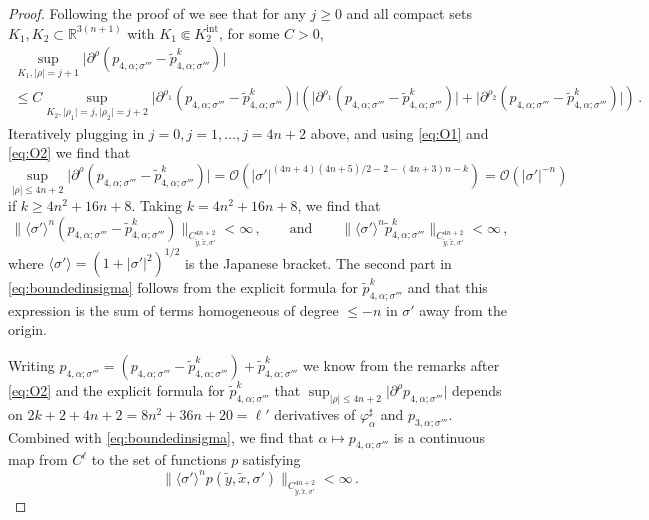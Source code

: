 \documentclass[11pt]{amsart}
\theoremstyle{definition}
\numberwithin{equation}{section}
\newcommand{\mR}{\mathbb{R}}                    %
\newcommand{\abs}[1]{\lvert #1 \rvert}          %
\newcommand{\norm}[1]{\lVert #1 \rVert}         %
\newcommand{\p}{\partial}
\begin{document}
\begin{proof}
    Following the proof of \cite[Thm.~2.9]{zbMATH03267579} we see that for any $j\geq 0$ and all compact sets $K_1,K_2 \subset \mR^{3(n+1)}$ with $K_1 \Subset K_2^{\mathrm{int}}$, for some $C>0$,
    \begin{gather*}
        \sup_{K_1,\abs{\rho}=j+1}\abs{\p^\rho (p_{4,\alpha;\sigma'''}-\tilde{p}^k_{4,\alpha;\sigma'''})} \\
        \leq C\sup_{K_2,\abs{\rho_1}=j,\abs{\rho_2}=j+2}\abs{\p^{\rho_1}(p_{4,\alpha;\sigma'''}-\tilde{p}^k_{4,\alpha;\sigma'''})}\left(\abs{\p^{\rho_1}(p_{4,\alpha;\sigma'''}-\tilde{p}^k_{4,\alpha;\sigma'''})}+\abs{\p^{\rho_2} (p_{4,\alpha;\sigma'''}-\tilde{p}^k_{4,\alpha;\sigma'''})}\right)\,.
    \end{gather*}
    Iteratively plugging in $j=0, j=1,\dots,j=4n+2$ above, and using \eqref{eq:O1} and \eqref{eq:O2} we find that
    \[
        \sup_{\abs{\rho}\leq 4n+2}\abs{\partial^\rho(p_{4,\alpha;\sigma'''}-\tilde{p}^k_{4,\alpha;\sigma'''})} = \mathcal{O}(\abs{\sigma'}^{(4n+4)(4n+5)/2-2-(4n+3)n-k}) = \mathcal{O}(\abs{\sigma'}^{-n})
    \]
    if $k\geq 4n^2+16n+8$. Taking $k = 4n^2+16n+8$, we find that%
    \begin{equation}\label{eq:boundedinsigma}
        \norm{\langle \sigma'\rangle^n(p_{4,\alpha;\sigma'''}-\tilde{p}^k_{4,\alpha;\sigma'''})}_{C^{4n+2}_{\tilde{y},\tilde{x},\sigma'}} < \infty\,,\qquad\text{and}\qquad \norm{\langle \sigma'\rangle^n\tilde{p}^k_{4,\alpha;\sigma'''}}_{C^{4n+2}_{\tilde{y},\tilde{x},\sigma'}} < \infty\,,
    \end{equation}
    where $\langle \sigma'\rangle = (1+\abs{\sigma'}^2)^{1/2}$ is the Japanese bracket. The second part in \eqref{eq:boundedinsigma} follows from the explicit formula for $\tilde{p}_{4,\alpha;\sigma'''}^k$ and that this expression is the sum of terms homogeneous of degree $\leq -n$ in $\sigma'$ away from the origin.

    Writing $p_{4,\alpha;\sigma'''}=(p_{4,\alpha;\sigma'''}-\tilde{p}^k_{4,\alpha;\sigma'''})+\tilde{p}^k_{4,\alpha;\sigma'''}$ we know from the remarks after \eqref{eq:O2} and the explicit formula for $\tilde{p}_{4,\alpha;\sigma'''}^k$ that 
    $\sup_{\abs{\rho}\leq 4n+2}\abs{\p^\rho p_{4,\alpha;\sigma'''}}$ depends on $2k+2+4n+2 = 8n^2+36n+20=\ell'$ derivatives of $\varphi_\alpha^\sharp$ and $p_{3,\alpha;\sigma'''}$. Combined with \eqref{eq:boundedinsigma}, we find that $\alpha\mapsto p_{4,\alpha;\sigma'''}$ is a continuous map from $C^{\ell}$ to the set of functions $p$ satisfying
	\[
		\norm{\langle \sigma'\rangle^n p(\tilde{y},\tilde{x},\sigma')}_{C^{4n+2}_{\tilde{y},\tilde{x},\sigma'}} < \infty\,.
	\]


\end{proof}
\end{document}
